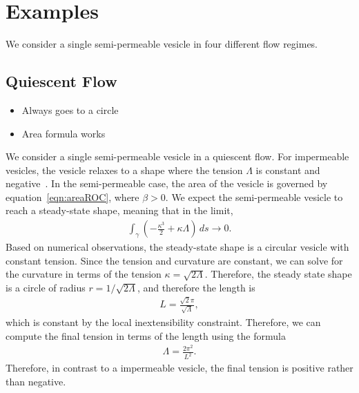 \documentclass[aps,prl,showpacs]{revtex4}
\begin{document}


\section{Examples}
We consider a single semi-permeable vesicle in four different flow
regimes.

\subsection{Quiescent Flow}
\begin{itemize}
  \item Always goes to a circle
  \item Area formula works
\end{itemize}

We consider a single semi-permeable vesicle in a quiescent flow. For
impermeable vesicles, the vesicle relaxes to a shape where the tension
$\Lambda$ is constant and negative~\cite{kra-win-sei-lip1996}. In the
semi-permeable case, the area of the vesicle is governed by
equation~\eqref{eqn:areaROC}, where $\beta > 0$. We expect the
semi-permeable vesicle to reach a steady-state shape, meaning that in
the limit,
\begin{align}
  \int_{\gamma} \left(-\frac{\kappa^3}{2} + \kappa \Lambda \right) \, ds
  \rightarrow 0.
\end{align}
Based on numerical observations, the steady-state shape is a circular
vesicle with constant tension. Since the tension and curvature are
constant, we can solve for the curvature in terms of the tension $\kappa
= \sqrt{2\Lambda}$. Therefore, the steady state shape is a circle of
radius $r = 1/\sqrt{2\Lambda}$, and therefore the length is
\begin{align}
  L = \frac{\sqrt{2}\pi}{\sqrt{\Lambda}},
\end{align}
which is constant by the local inextensibility constraint. Therefore, we
can compute the final tension in terms of the length using the formula
\begin{align}
  \Lambda = \frac{2\pi^2}{L^2}.
  \label{eqn:finalTension}
\end{align}
Therefore, in contrast to a impermeable vesicle, the final tension is
positive rather than negative.
\end{document}

